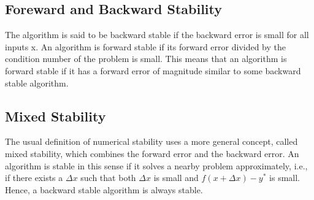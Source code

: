\documentclass[12pt]{elsart}
\begin{document}
\subsection{Foreward and Backward Stability}
\label{sec:stability}
The algorithm is said to be backward stable if the backward error is small for all inputs x.  An algorithm is forward stable if its forward error divided by the condition number of the problem is small. This means that an algorithm is forward stable if it has a forward error of magnitude similar to some backward stable algorithm.
\subsection{Mixed Stability}
\label{sec:mixed-stability}
The usual definition of numerical stability uses a more general concept, called mixed stability, which combines the forward error and the backward error. An algorithm is stable in this sense if it solves a nearby problem approximately, i.e., if there exists a $\Delta x$ such that both $\Delta x$ is small and $f(x + \Delta x) - y^\ast $ is small. Hence, a backward stable algorithm is always stable.













\end{document}
